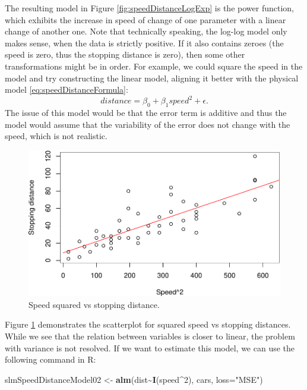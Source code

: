 \documentclass[
]{book}
\newenvironment{Shaded}{\begin{snugshade}}{\end{snugshade}}
\newcommand{\AttributeTok}[1]{\textcolor[rgb]{0.13,0.29,0.53}{#1}}
\newcommand{\DecValTok}[1]{\textcolor[rgb]{0.00,0.00,0.81}{#1}}
\newcommand{\FunctionTok}[1]{\textcolor[rgb]{0.13,0.29,0.53}{\textbf{#1}}}
\newcommand{\NormalTok}[1]{#1}
\newcommand{\OtherTok}[1]{\textcolor[rgb]{0.56,0.35,0.01}{#1}}
\newcommand{\SpecialCharTok}[1]{\textcolor[rgb]{0.81,0.36,0.00}{\textbf{#1}}}
\newcommand{\StringTok}[1]{\textcolor[rgb]{0.31,0.60,0.02}{#1}}
\theoremstyle{definition}
\theoremstyle{definition}
\theoremstyle{definition}
\theoremstyle{definition}
\theoremstyle{remark}
\begin{document}
The resulting model in Figure \ref{fig:speedDistanceLogExp} is the power function, which exhibits the increase in speed of change of one parameter with a linear change of another one. Note that technically speaking, the log-log model only makes sense, when the data is strictly positive. If it also contains zeroes (the speed is zero, thus the stopping distance is zero), then some other transformations might be in order. For example, we could square the speed in the model and try constructing the linear model, aligning it better with the physical model \eqref{eq:speedDistanceFormula}:
\begin{equation}
    distance = \beta_0 + \beta_1 speed^2 + \epsilon .
    \label{eq:speedDistanceModelSquare}
\end{equation}
The issue of this model would be that the error term is additive and thus the model would assume that the variability of the error does not change with the speed, which is not realistic.

\begin{figure}
\centering
\includegraphics{Svetunkov---Statistics-for-Business-Analytics_files/figure-latex/speedDistanceSquare-1.pdf}
\caption{\label{fig:speedDistanceSquare}Speed squared vs stopping distance.}
\end{figure}

Figure \ref{fig:speedDistanceSquare} demonstrates the scatterplot for squared speed vs stopping distances. While we see that the relation between variables is closer to linear, the problem with variance is not resolved. If we want to estimate this model, we can use the following command in R:

\begin{Shaded}
\begin{Highlighting}[]
\NormalTok{slmSpeedDistanceModel02 }\OtherTok{\textless{}{-}} \FunctionTok{alm}\NormalTok{(dist}\SpecialCharTok{\textasciitilde{}}\FunctionTok{I}\NormalTok{(speed}\SpecialCharTok{\^{}}\DecValTok{2}\NormalTok{), cars, }\AttributeTok{loss=}\StringTok{"MSE"}\NormalTok{)}
\end{Highlighting}
\end{Shaded}
\end{document}
